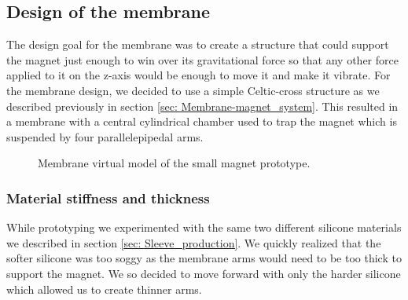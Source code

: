 \subsection{Design of the membrane}
\label{sec: Design_of_the_membrane}
The design goal for the membrane was to create a structure that could support the magnet just enough to win over its gravitational force so that any other force applied to it on the z-axis would be enough to move it and make it vibrate.
For the membrane design, we decided to use a simple Celtic-cross structure as we described previously in section \ref{sec: Membrane-magnet_system}.
This resulted in a membrane with a central cylindrical chamber used to trap the magnet which is suspended by four parallelepipedal arms.
\begin{figure}
    \centering
    \caption{Membrane virtual model of the small magnet prototype.}
    \label{fig: Membrane_v1_model}
\end{figure}

\subsubsection{Material stiffness and thickness}
While prototyping we experimented with the same two different silicone materials we described in section \ref{sec: Sleeve_production}.
We quickly realized that the softer silicone was too soggy as the membrane arms would need to be too thick to support the magnet.
We so decided to move forward with only the harder silicone which allowed us to create thinner arms.

